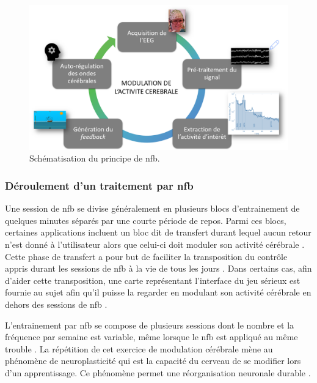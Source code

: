 \begin{figure}[h!]
  \centering
	\includegraphics[width=1\linewidth]{figures/chapter-1/introduction-nfb-explication} 
  \caption{Schématisation du principe de \gls{nfb}.}
  \label{Figure:introduction_nfb_explications}
\end{figure}

\subsubsection{Déroulement d'un traitement par \gls{nfb}}

Une session de \gls{nfb} se divise généralement en plusieurs blocs d'entrainement de quelques minutes séparés par une courte période de repos.
Parmi ces blocs, certaines applications incluent 
un bloc dit de transfert durant lequel aucun retour n'est donné à l'utilisateur alors que celui-ci doit moduler son activité cérébrale \citep{Bioulac2019,
Bluschke2016, Gani2008, Strehl2006}. Cette phase de transfert a pour but de faciliter la transposition du contrôle appris durant les 
sessions de \gls{nfb} à la vie de tous les jours \citep{Arns2014}. Dans certains cas, afin d'aider cette transposition, une carte représentant l'interface du jeu sérieux est 
fournie au sujet afin qu'il puisse la regarder en modulant son activité cérébrale en dehors des sessions de \gls{nfb} \citep{Leins2007}.

L'entrainement par \gls{nfb} se compose de plusieurs sessions dont le nombre et la fréquence par semaine est variable, même lorsque le \gls{nfb} est appliqué au même trouble 
\citep{Enriquez2017}. La répétition de cet exercice de modulation cérébrale mène au phénomène de 
neuroplasticité \citep{VanDoren2017, Ros2010} qui est la capacité du cerveau de se modifier lors d'un apprentissage. Ce phénomène 
permet une réorganisation neuronale durable \citep{VanDoren2017}. 

